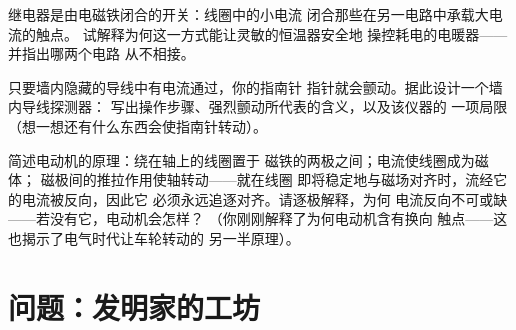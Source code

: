 \begin{exercise}[$\star\star$]\label{exo:g8:electric-current-effects:10}
继电器是由电磁铁闭合的开关：线圈中的小电流
闭合那些在另一电路中承载大电流的触点。
试解释为何这一方式能让灵敏的恒温器安全地
操控耗电的电暖器——并指出哪两个电路
从不相接。
\end{exercise}

\begin{exercise}[$\star\star$]\label{exo:g8:electric-current-effects:11}
只要墙内隐藏的导线中有电流通过，你的指南针
指针就会颤动。据此设计一个墙内导线探测器：
写出操作步骤、强烈颤动所代表的含义，以及该仪器的
一项局限（想一想还有什么东西会使指南针转动）。
\end{exercise}

\begin{exercise}[$\star\star\star$]\label{exo:g8:electric-current-effects:12}
简述电动机的原理：绕在轴上的线圈置于
磁铁的两极之间；电流使线圈成为磁体；
磁极间的推拉作用使轴转动——就在线圈
即将稳定地与磁场对齐时，流经它的电流被反向，因此它
必须永远追逐对齐。请逐极解释，为何
电流反向不可或缺——若没有它，电动机会怎样？
（你刚刚解释了为何电动机含有换向
触点——这也揭示了电气时代让车轮转动的
另一半原理）。
\end{exercise}

\section{问题：发明家的工坊}

